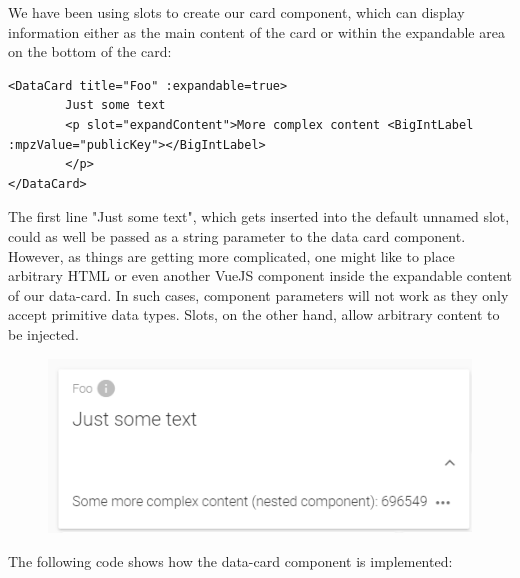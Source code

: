 We have been using slots to create our card component, which can display information either as the main content of the card or within the expandable area on the bottom of the card:

\begin{verbatim}
<DataCard title="Foo" :expandable=true>
		Just some text
		<p slot="expandContent">More complex content <BigIntLabel :mpzValue="publicKey"></BigIntLabel>
		</p>
</DataCard>
\end{verbatim}
The first line "{}Just some text"{}, which gets inserted into the default unnamed slot, could as well be passed as a string parameter to the data card component. However, as things are getting more complicated, one might like to place arbitrary HTML or even another VueJS component inside the expandable content of our data-card. In such cases, component parameters will not work as they only accept primitive data types. Slots, on the other hand, allow arbitrary content to be injected.
\begin{figure}[h!]
\begin{center}
\includegraphics[scale=1.0]{assets/datacardexample.png}\\
\label{DataCardXample}%
\end{center}
\end{figure}
The following code shows how the data-card component is implemented:

